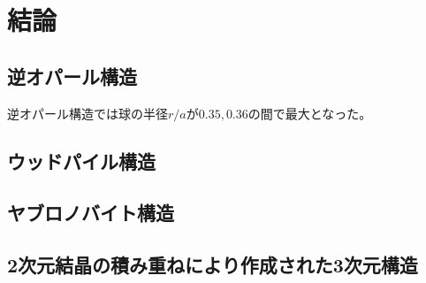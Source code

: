 \documentclass[platex,dvipdfmx]{jsreport}
\numberwithin{equation}{section}
\begin{document}
\chapter{結論}

\section{逆オパール構造}
逆オパール構造では球の半径$r / a$が$0.35, 0.36$の間で最大となった。



\section{ウッドパイル構造}


\section{ヤブロノバイト構造}
\section{2次元結晶の積み重ねにより作成された3次元構造}
\end{document}
